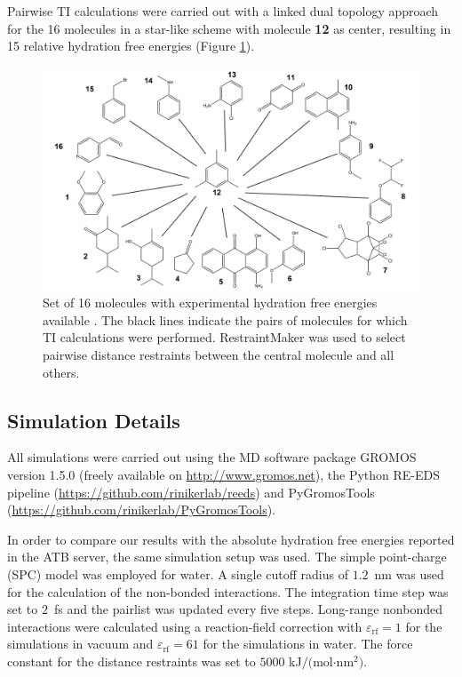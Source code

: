 Pairwise TI calculations were carried out with a linked dual topology approach for the 16 molecules in a star-like scheme with molecule \textbf{12} as center, resulting in 15 relative hydration free energies (Figure \ref{fig: Pairwise_TI_M030_Graph}).
\begin{figure}[h]
    \centering
    \includegraphics[width=\textwidth]{fig/methods/StateGraph_TI_2D_enumerated.png}
    \caption{Set of 16 molecules with experimental hydration free energies available \cite{Stroet2018,Wolfenden1987,Rizzo2006,Nicholls2008,Guthrie2009,Guthrie2014,Mobley2014}. The black lines indicate the pairs of molecules for which TI calculations were performed. RestraintMaker was used to select pairwise distance restraints between the central molecule and all others.} 
    \label{fig: Pairwise_TI_M030_Graph}
\end{figure}

\subsection{Simulation Details}
All simulations were carried out using the MD software package GROMOS\cite{Schmid2012} version 1.5.0 (freely available on \url{http://www.gromos.net}),\cite{Ries2022} the Python RE-EDS pipeline (\url{https://github.com/rinikerlab/reeds}) 
and PyGromosTools\cite{Lehner2021} (\url{https://github.com/rinikerlab/PyGromosTools}). 

In order to compare our results with the absolute hydration free energies reported in the ATB server,\cite{Stroet2018} the same simulation setup was used.
The simple point-charge (SPC) model\cite{Berendsen1981} was employed for water. A single cutoff radius of $1.2$~nm was used for the calculation of the non-bonded interactions. The integration time step was set to $2$~fs and the pairlist was updated every five steps. Long-range nonbonded interactions were calculated using a reaction-field correction\cite{Tironi1995} with $\varepsilon_{\text{rf}}=1$ for the simulations in vacuum and $\varepsilon_{\text{rf}}=61$ for the simulations in water.\cite{Heinz2001} The force constant for the distance restraints was set to $5000$ kJ$/($mol$\cdot$nm$^2)$.


